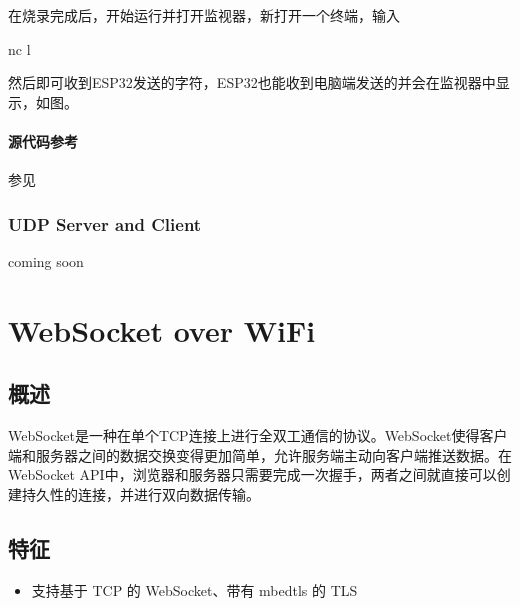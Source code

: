 \documentclass[a4paper,12pt,english]{sphinxmanual}
\begin{document}
{{\sphinxAtStartPar
在烧录完成后，开始运行并打开监视器，新打开一个终端，输入

\begin{sphinxVerbatim}[commandchars=\\\{\}]
nc \PYGZhy{}l 
\end{sphinxVerbatim}

\sphinxAtStartPar
然后即可收到ESP32发送的字符，ESP32也能收到电脑端发送的并会在监视器中显示，如图。

\sphinxAtStartPar
{}


\paragraph{源代码参考}
\label{\detokenize{exp-esp32/socket/tcp:id6}}
\sphinxAtStartPar
参见{\hyperref[\detokenize{reference::doc}]{}}

\sphinxstepscope


\subsubsection{UDP Server and Client}
\label{\detokenize{exp-esp32/socket/udp:udp-server-and-client}}\label{\detokenize{exp-esp32/socket/udp::doc}}
\sphinxAtStartPar
coming soon

\sphinxstepscope


\section{WebSocket over WiFi}
\label{\detokenize{exp-esp32/websocket:websocket-over-wifi}}\label{\detokenize{exp-esp32/websocket::doc}}

\subsection{概述}
\label{\detokenize{exp-esp32/websocket:id1}}
\sphinxAtStartPar
WebSocket是一种在单个TCP连接上进行全双工通信的协议。WebSocket使得客户端和服务器之间的数据交换变得更加简单，允许服务端主动向客户端推送数据。在WebSocket API中，浏览器和服务器只需要完成一次握手，两者之间就直接可以创建持久性的连接，并进行双向数据传输。


\subsection{特征}
\label{\detokenize{exp-esp32/websocket:id2}}\begin{itemize}
\item {} 
\sphinxAtStartPar
支持基于 TCP 的 WebSocket、带有 mbedtls 的 TLS


\end{itemize}}}
\end{document}
